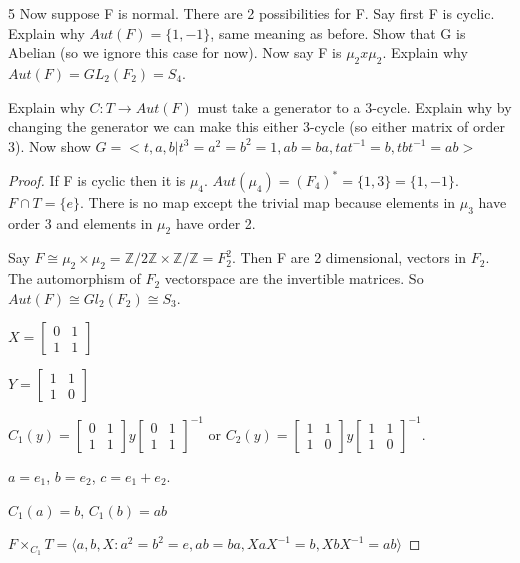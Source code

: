 \documentclass{article}
\newcommand{\Z}{\mathbb{Z}}
\begin{document}
\bigskip

\begin{PROB}{5}\label{Problem 5.}
    Now suppose F is normal. There are 2 possibilities for F. Say first F is cyclic. Explain why $Aut(F) = \{1,-1\}$, same meaning as before. Show that G is Abelian (so we ignore this case for now).  Now say F is $\mu_2 x \mu_2$. Explain why $Aut(F) = GL_2(F_2) = S_4$.  
    
    Explain why $C: T \to Aut(F)$ must take a generator to a 3-cycle. Explain why by changing the generator we can make this either 3-cycle (so either matrix of order 3). Now show $G = <t,a,b| t^3 = a^2 = b^2 =1, ab=ba, t a t^{-1} = b, tbt^{-1} = ab>$
\end{PROB}
\begin{proof}
    If F is cyclic then it is $\mu_4$. $Aut(\mu_4) = (F_4)^* = \{1, 3\} = \{1, -1\}$. $F \cap T = \{e\}$. There is no map except the trivial map because elements in $\mu_3$ have order 3 and elements in $\mu_2$ have order 2.
    
    
    Say $F \cong \mu_2 \times \mu_2 = \Z/2\Z \times \Z/\Z = F_2^2$. Then F are 2 dimensional, vectors in $F_2$. The automorphism of $F_2$ vectorspace are the invertible matrices. So $Aut(F) \cong Gl_2(F_2) \cong S_3$.

    $X = \begin{bmatrix}
        0 & 1 \\ 1 & 1
    \end{bmatrix}$

    $Y = \begin{bmatrix}
        1 & 1 \\ 1 & 0
    \end{bmatrix}$
    
    $C_1(y) = \begin{bmatrix}
        0 & 1 \\ 1 & 1
    \end{bmatrix}y\begin{bmatrix}
    0 & 1 \\ 1 & 1
\end{bmatrix}^{-1}$ or $C_2(y) = \begin{bmatrix}
        1 & 1 \\ 1 & 0
    \end{bmatrix}y\begin{bmatrix}
        1 & 1 \\ 1 & 0
    \end{bmatrix}^{-1}$. 

    $a = e_1$, $b = e_2$, $c = e_1 + e_2$. 

    $C_1(a) = b$, $C_1(b) = ab$

    $F \times_{C_1} T = \langle a, b, X : a^2 = b^2 = e, ab = ba, XaX^{-1} = b, XbX^{-1} = ab \rangle$
\end{proof}
\end{document}
